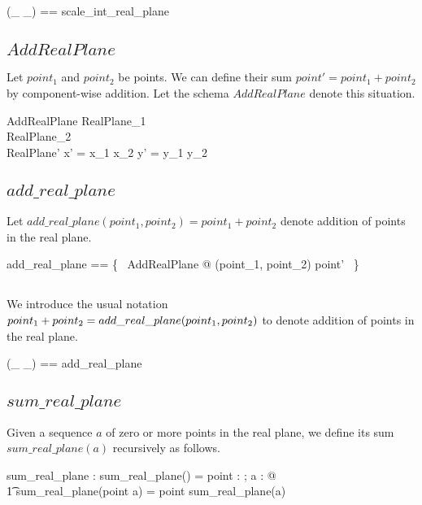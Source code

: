 \documentclass{amsart}
\begin{document}
\begin{zed}
	(\_ \smulZRtwo \_) == scale\_int\_real\_plane
\end{zed}

\subsection{$AddRealPlane$}

Let $point_1$ and $point_2$ be points.
We can define their sum $point' = point_1 + point_2$ by component-wise addition.
Let the schema $AddRealPlane$ denote this situation.

\begin{schema}{AddRealPlane}
	RealPlane_1 \\
	RealPlane_2 \\
	RealPlane'
\where
	x' = x_1 \addR x_2
\also
	y' = y_1 \addR y_2
\end{schema}

\subsection{$add\_real\_plane$}

Let $add\_real\_plane(point_1, point_2) = point_1 + point_2$ denote addition of points in the
real plane.

\begin{zed}
	add\_real\_plane == \{~ AddRealPlane @ (point_1, point_2) \mapsto point' ~\}
\end{zed}

\subsection{}

We introduce the usual notation $point_1 \mathbin{+} point_2 = add\_real\_plane(point_1, point_2)$
to denote addition of points in the real plane.

\begin{zed}
	(\_ \addRtwo \_) == add\_real\_plane
\end{zed}

\subsection{$sum\_real\_plane$}

Given a sequence $a$ of zero or more points in the real plane,
we define its sum $sum\_real\_plane(a)$ recursively as follows.

\begin{axdef}
	sum\_real\_plane : \seq \Rtwo \fun \Rtwo
\where
	sum\_real\_plane(\langle \rangle) = \zeroRtwo
\also
	\forall point : \Rtwo; a : \seq \Rtwo @ \\
	\t1	sum\_real\_plane(\langle point \rangle \cat a) = point \addRtwo sum\_real\_plane(a)
\end{axdef}
\end{document}
